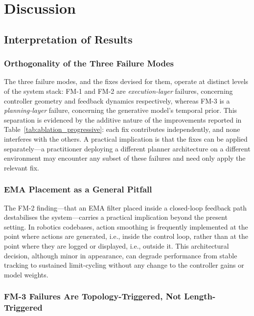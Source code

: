 \documentclass[12pt, a4paper, oneside]{report}
\theoremstyle{definition}
\begin{document}
\chapter{Discussion}
\label{chap:discussion}

\section{Interpretation of Results}
\label{sec:interpretation}

\subsection{Orthogonality of the Three Failure Modes}

The three failure modes, and the fixes devised for them, operate at
distinct levels of the system stack: FM-1 and FM-2 are
\emph{execution-layer} failures, concerning controller geometry and
feedback dynamics respectively, whereas FM-3 is a
\emph{planning-layer} failure, concerning the generative model's
temporal prior. This separation is evidenced by the additive
nature of the improvements reported in
Table~\ref{tab:ablation_progressive}: each fix contributes
independently, and none interferes with the others. A practical
implication is that the fixes can be applied separately---a
practitioner deploying a different planner architecture on a
different environment may encounter any subset of these failures
and need only apply the relevant fix.

\subsection{EMA Placement as a General Pitfall}

The FM-2 finding---that an EMA filter placed inside a closed-loop
feedback path destabilises the system---carries a practical
implication beyond the present setting. In robotics codebases,
action smoothing is frequently implemented at the point where
actions are generated, i.e., inside the control loop, rather than
at the point where they are logged or displayed, i.e., outside it.
This architectural decision, although minor in appearance, can
degrade performance from stable tracking to sustained limit-cycling
without any change to the controller gains or model weights.

\subsection{FM-3 Failures Are Topology-Triggered, Not Length-Triggered}
\label{sec:fm3_topology}
\end{document}
